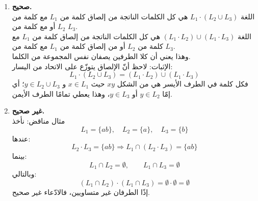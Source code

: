 \begin{boxSolution}
\begin{enumerate}[itemsep=1.5em, label=\textbf{(\arabic*)}, start=2]
        \item \textbf{صحيح.} \\
        اللغة \(L_1\cdot (L_2\cup L_3)\) هي كل الكلمات الناتجة من إلصاق كلمة من \(L_1\) مع كلمة من \(L_2\) أو مع كلمة من \(L_3\). \\
        اللغة \((L_1\cdot L_2)\cup (L_1\cdot L_3)\) هي كل الكلمات الناتجة من إلصاق كلمة من \(L_1\) مع كلمة من \(L_2\) أو من إلصاق كلمة من \(L_1\) مع كلمة من \(L_3\). \\
        وهذا يعني أن كلا الطرفين يصفان نفس المجموعة من الكلما. \\
        الإثبات: لاحظ أنّ الإلصاق يتوزّع على الاتحاد من اليسار:
        \[L_1\cdot (L_2\cup L_3)=(L_1\cdot L_2)\cup (L_1\cdot L_3)\]
        فكل كلمة في الطرف الأيسر هي من الشكل $xy$ حيث $x\in L_1$ و $y\in L_2\cup L_3$؛
        أي إمّا $y\in L_2$ أو $y\in L_3$، وهذا يعطي تمامًا الطرف الأيمن.

        \item \textbf{غير صحيح.} \\
        مثال مناقض: نأخذ
        \[L_1=\{ab\},\quad L_2=\{a\},\quad L_3=\{b\}\]
        عندها:
        \[L_2\cdot L_3=\{ab\}\Rightarrow L_1\cap (L_2\cdot L_3)=\{ab\}\]
        بينما:
        \[L_1\cap L_2=\emptyset,\qquad L_1\cap L_3=\emptyset\]
        وبالتالي:
        \[(L_1\cap L_2)\cdot (L_1\cap L_3)=\emptyset\cdot\emptyset=\emptyset\]
        إذًا الطرفان غير متساويين، فالادّعاء غير صحيح.
    \end{enumerate}
\end{boxSolution}

\clearpage
\fi
